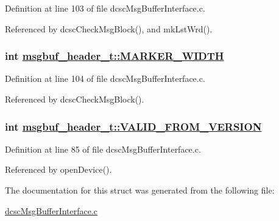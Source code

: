Definition at line 103 of file dcsc\-Msg\-Buffer\-Interface.c.

Referenced by dcsc\-Check\-Msg\-Block(), and mk\-Lst\-Wrd().\hypertarget{structmsgbuf__header__t_bb50392df1ee0c30073618c236a80174}{
\subsubsection[MARKER\_\-WIDTH]{\setlength{\rightskip}{0pt plus 5cm}int \hyperlink{structmsgbuf__header__t_bb50392df1ee0c30073618c236a80174}{msgbuf\_\-header\_\-t::MARKER\_\-WIDTH}}}
\label{structmsgbuf__header__t_bb50392df1ee0c30073618c236a80174}




Definition at line 104 of file dcsc\-Msg\-Buffer\-Interface.c.

Referenced by dcsc\-Check\-Msg\-Block().\hypertarget{structmsgbuf__header__t_2d7dc0360571deed5bb400535dd09318}{
\subsubsection[VALID\_\-FROM\_\-VERSION]{\setlength{\rightskip}{0pt plus 5cm}int \hyperlink{structmsgbuf__header__t_2d7dc0360571deed5bb400535dd09318}{msgbuf\_\-header\_\-t::VALID\_\-FROM\_\-VERSION}}}
\label{structmsgbuf__header__t_2d7dc0360571deed5bb400535dd09318}




Definition at line 85 of file dcsc\-Msg\-Buffer\-Interface.c.

Referenced by open\-Device().

The documentation for this struct was generated from the following file:\begin{CompactItemize}
\item 
\hyperlink{dcscMsgBufferInterface_8c}{dcsc\-Msg\-Buffer\-Interface.c}\end{CompactItemize}
